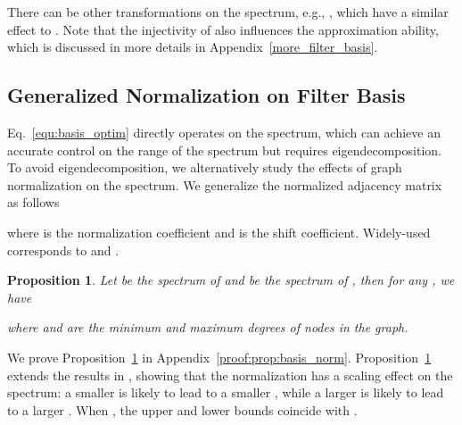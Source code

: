 \documentclass[nohyperref]{article}
\theoremstyle{plain}
\newtheorem{proposition}[theorem]{Proposition}
\theoremstyle{definition}
\theoremstyle{remark}
\begin{document}
There can be other transformations on the spectrum, e.g., , which have a similar effect to .
Note that the injectivity of  also influences the approximation ability, which is discussed in more details in Appendix~\ref{more_filter_basis}.


\subsection{Generalized Normalization on Filter Basis}

Eq.~\ref{equ:basis_optim} directly operates on the spectrum, which can achieve an accurate control on the range of the spectrum but requires eigendecomposition.
To avoid eigendecomposition, we alternatively study the effects of graph normalization on the spectrum.
We generalize the normalized adjacency matrix as follows

where  is the normalization coefficient and  is the shift coefficient.
Widely-used  corresponds to  and .

\begin{proposition}
	\label{prop:basis_norm}
	Let  be the spectrum of  and  be the spectrum of , then for any , we have
	
	where  and  are the minimum and maximum degrees of nodes in the graph.
\end{proposition}
We prove Proposition~\ref{prop:basis_norm} in Appendix~\ref{proof:prop:basis_norm}.
Proposition~\ref{prop:basis_norm} extends the results in \cite{4389477}, showing that the normalization has a scaling effect on the spectrum: a smaller  is likely to lead to a smaller ,
while a larger  is likely to lead to a larger .
When , the upper and lower bounds coincide with .
\end{document}
